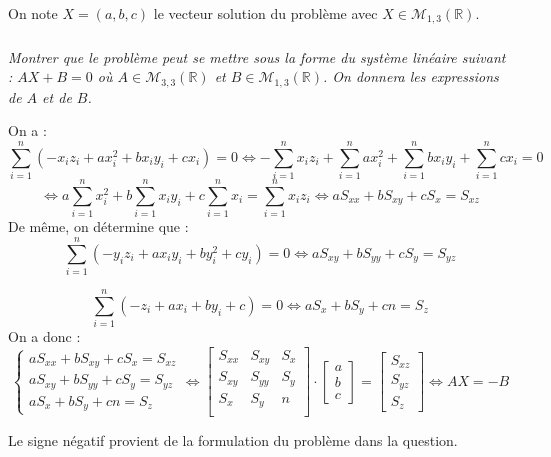 
On note $X=(a,b,c)$ le vecteur solution du problème avec $X\in \mathcal{M}_{1,3} \left(\mathbb{R} \right)$.


\subparagraph{}
\textit{Montrer que le problème peut se mettre sous la forme du système linéaire suivant : $AX + B = 0$  où $A \in \mathcal{M}_{3,3} \left(\mathbb{R} \right)$ et  $B \in \mathcal{M}_{1,3} \left(\mathbb{R} \right)$. On donnera les expressions de $A$ et de $B$.}

\ifprof
\begin{corrige}
On a : 
$$
\sum\limits_{i=1}^{n}   \left(-x_iz_i +ax_i^2 +bx_i y_i +cx_i\right) = 0 
\Leftrightarrow    - \sum\limits_{i=1}^{n} x_iz_i +\sum\limits_{i=1}^{n}ax_i^2 +\sum\limits_{i=1}^{n}bx_i y_i +\sum\limits_{i=1}^{n}cx_i  = 0 
$$
$$
\Leftrightarrow    a\sum\limits_{i=1}^{n}x_i^2 +b\sum\limits_{i=1}^{n}x_i y_i +c\sum\limits_{i=1}^{n}x_i  = \sum\limits_{i=1}^{n} x_iz_i
\Leftrightarrow    aS_{xx} +bS_{xy} +cS_x  =S_{xz}
$$
De même, on détermine que : 
$$
\sum\limits_{i=1}^{n}     \left(-y_iz_i + ax_i y_i  +by_i^2 +cy_i\right)  = 0
\Leftrightarrow aS_{xy} + bS_{yy}+cS_y = S_{yz}
$$

$$
\sum\limits_{i=1}^{n}  \left(-z_i +ax_i +by_i +c\right) = 0
\Leftrightarrow aS_{x} + bS_{y}+cn = S_{z}
$$
On a donc : 
$$
\left\{
\begin{array}{l}
aS_{xx} +bS_{xy} +cS_x  =S_{xz} \\
aS_{xy} + bS_{yy}+cS_y = S_{yz} \\
aS_{x} + bS_{y}+cn = S_{z}
\end{array}
\right.
\Leftrightarrow
\left[ 
\begin{array}{ccc}
S_{xx} & S_{xy} & S_x \\
S_{xy} & S_{yy} & S_y \\
S_{x} & S_{y} & n \\
\end{array}
\right]
\cdot 
\left[ 
\begin{array}{c}
a \\b \\ c\end{array}
\right]
=
\left[ 
\begin{array}{c}
S_{xz} \\
S_{yz} \\ 
S_{z}\end{array}
\right]
\Leftrightarrow
AX = -B
$$

Le signe négatif provient de la formulation du problème dans la question. 

\end{corrige}

